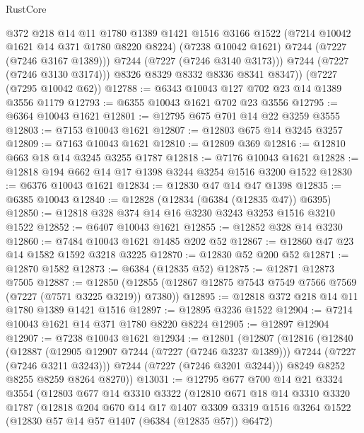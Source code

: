 \begin{lexlean}{RustCore}
\begin{coremodule}
              @372
              @218
              @14
              @11
              @1780
              @1389
              @1421
              @1516
              @3166
              @1522
              (@7214 @10042 @1621 @14 @371 @1780 @8220 @8224)
              (@7238 @10042 @1621)
              @7244
              (@7227 (@7246 @3167 @1389)))
            @7244
            (@7227 (@7246 @3140 @3173)))
          @7244
          (@7227 (@7246 @3130 @3174)))
        @8326
        @8329
        @8332
        @8336
        @8341
        @8347))
    (@7227 (@7295 @10042 @62))
@12788 := @6343 @10043 @127 @702 @23 @14 @1389 @3556 @1179
@12793 := @6355 @10043 @1621 @702 @23 @3556
@12795 := @6364 @10043 @1621
@12801 := @12795 @675 @701 @14 @22 @3259 @3555
@12803 := @7153 @10043 @1621
@12807 := @12803 @675 @14 @3245 @3257
@12809 := @7163 @10043 @1621
@12810 := @12809 @369
@12816 := @12810 @663 @18 @14 @3245 @3255 @1787
@12818 := @7176 @10043 @1621
@12828 := @12818 @194 @662 @14 @17 @1398 @3244 @3254 @1516 @3200 @1522
@12830 := @6376 @10043 @1621
@12834 := @12830 @47 @14 @47 @1398
@12835 := @6385 @10043
@12840 := @12828 (@12834 (@6384 (@12835 @47)) @6395)
@12850 := @12818 @328 @374 @14 @16 @3230 @3243 @3253 @1516 @3210 @1522
@12852 := @6407 @10043 @1621
@12855 := @12852 @328 @14 @3230
@12860 := @7484 @10043 @1621 @1485 @202 @52
@12867 := @12860 @47 @23 @14 @1582 @1592 @3218 @3225
@12870 := @12830 @52 @200 @52
@12871 := @12870 @1582
@12873 := @6384 (@12835 @52)
@12875 := @12871 @12873 @7505
@12887 := @12850 (@12855 (@12867 @12875 @7543 @7549 @7566 @7569 (@7227 (@7571 @3225 @3219)) @7380))
@12895 := @12818 @372 @218 @14 @11 @1780 @1389 @1421 @1516
@12897 := @12895 @3236 @1522
@12904 := @7214 @10043 @1621 @14 @371 @1780 @8220 @8224
@12905 := @12897 @12904
@12907 := @7238 @10043 @1621
@12934 := @12801
    (@12807
      (@12816
        (@12840
          (@12887
            (@12905 @12907 @7244 (@7227 (@7246 @3237 @1389)))
            @7244
            (@7227 (@7246 @3211 @3243)))
          @7244
          (@7227 (@7246 @3201 @3244)))
        @8249
        @8252
        @8255
        @8259
        @8264
        @8270))
@13031 := @12795
    @677
    @700
    @14
    @21
    @3324
    @3554
    (@12803
      @677
      @14
      @3310
      @3322
      (@12810
        @671
        @18
        @14
        @3310
        @3320
        @1787
        (@12818
          @204
          @670
          @14
          @17
          @1407
          @3309
          @3319
          @1516
          @3264
          @1522
          (@12830 @57 @14 @57 @1407 (@6384 (@12835 @57)) @6472)

\end{coremodule}
\end{lexlean}
